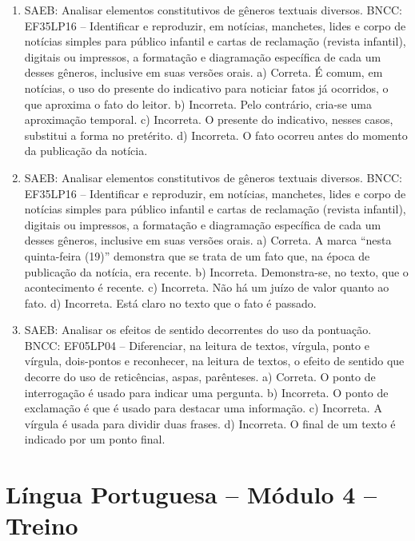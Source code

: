 \begin{enumerate}
\item
SAEB: Analisar elementos constitutivos de gêneros textuais diversos.
BNCC: EF35LP16 – Identificar e reproduzir, em notícias, manchetes, lides
e corpo de notícias simples para público infantil e cartas de reclamação
(revista infantil), digitais ou impressos, a formatação e diagramação
específica de cada um desses gêneros, inclusive em suas versões orais.
a) Correta. É comum, em notícias, o uso do presente do indicativo para noticiar fatos já ocorridos, o que aproxima o fato do leitor.
b) Incorreta. Pelo contrário, cria-se uma aproximação temporal.
c) Incorreta. O presente do indicativo, nesses casos, substitui a forma no pretérito.
d) Incorreta. O fato ocorreu antes do momento da publicação da notícia.

\item
SAEB: Analisar elementos constitutivos de gêneros textuais diversos.
BNCC: EF35LP16 – Identificar e reproduzir, em notícias, manchetes, lides
e corpo de notícias simples para público infantil e cartas de reclamação
(revista infantil), digitais ou impressos, a formatação e diagramação
específica de cada um desses gêneros, inclusive em suas versões orais.
a) Correta. A marca “nesta quinta-feira (19)” demonstra que se trata de um fato que, na época de publicação da notícia, era recente.
b) Incorreta. Demonstra-se, no texto, que o acontecimento é recente.
c) Incorreta. Não há um juízo de valor quanto ao fato.
d) Incorreta. Está claro no texto que o fato é passado.

\item
SAEB: Analisar os efeitos de sentido decorrentes do uso da pontuação.
BNCC: EF05LP04 – Diferenciar, na leitura de textos, vírgula, ponto e
vírgula, dois-pontos e reconhecer, na leitura de textos, o efeito de
sentido que decorre do uso de reticências, aspas, parênteses.
a) Correta. O ponto de interrogação é usado para indicar uma pergunta.
b) Incorreta. O ponto de exclamação é que é usado para destacar uma
informação.
c) Incorreta. A vírgula é usada para dividir duas frases.
d) Incorreta. O final de um texto é indicado por um ponto final.
\end{enumerate}

\section*{Língua Portuguesa – Módulo 4 – Treino}

